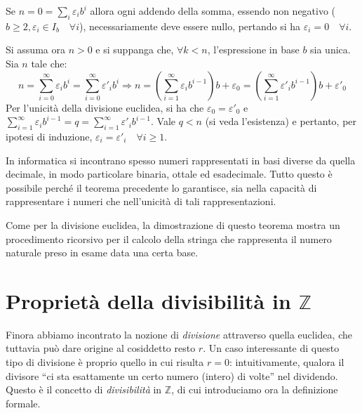 \begin{tcolorbox}[enhanced, breakable, title={Teorema di rappresentazione dei naturali in base arbitraria}]
Se $n = 0 = \sum_{i} \varepsilon_i b^i$ allora ogni addendo della somma,
essendo non negativo ($b \geq 2, \varepsilon_i \in I_b \quad \forall i$), necessariamente deve essere nullo, pertando si
ha $\varepsilon_i = 0 \quad \forall i$.

Si assuma ora $n > 0$ e si suppanga che, $\forall k < n$, l'espressione
in base $b$ sia unica. Sia $n$ tale che:
\[
    n = \sum_{i=0}^{\infty}\varepsilon_i b^i = \sum_{i=0}^{\infty}\varepsilon'_i b^i \Longrightarrow
    n = \left(\sum_{i=1}^{\infty}\varepsilon_i b^{i-1}\right)b + \varepsilon_0 = \left(\sum_{i=1}^{\infty}\varepsilon'_i b^{i-1}\right)b + \varepsilon'_0
\]
Per l'unicità della divisione euclidea, si ha che $\varepsilon_0 = \varepsilon'_0$
e $\sum_{i=1}^{\infty}\varepsilon_i b^{i-1} = q = \sum_{i=1}^{\infty}\varepsilon'_i b^{i-1}$.
Vale $q < n$ (si veda l'esistenza) e pertanto, per ipotesi di induzione,
$\varepsilon_i = \varepsilon'_i \quad \forall i \geq 1$.
\cvd
\end{tcolorbox}
In informatica si incontrano spesso numeri rappresentati in basi
diverse da quella decimale, in modo particolare binaria, ottale
ed esadecimale. Tutto questo è possibile perché il teorema precedente
lo garantisce, sia nella capacità di rappresentare i numeri che
nell'unicità di tali rappresentazioni.

Come per la divisione euclidea, la dimostrazione di questo teorema
mostra un procedimento ricorsivo per il calcolo della stringa che
rappresenta il numero naturale preso in esame data una certa base.

\begin{tcolorbox}[enhanced, breakable, colback=red!30, colframe=red!30!black, title = {Algoritmo di conversione tra rappresentabilità dei naturali in basi diverse}]

\end{tcolorbox}


\section{Proprietà della divisibilità in $\mathbb{Z}$}
Finora abbiamo incontrato la nozione di \textit{divisione}
attraverso quella euclidea, che tuttavia può dare origine
al cosiddetto resto $r$. Un caso interessante di questo
tipo di divisione è proprio quello in cui risulta $r = 0$:
intuitivamente, qualora il divisore ``ci sta esattamente un certo numero
(intero) di volte'' nel dividendo. Questo è il concetto di
\textit{divisibilità} in $\mathbb{Z}$, di cui introduciamo ora la definizione
formale.

